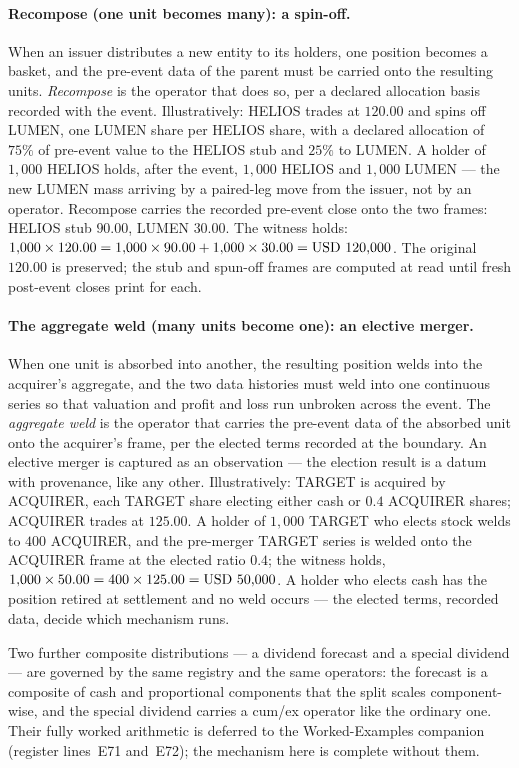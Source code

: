 \paragraph{Recompose (one unit becomes many): a spin-off.}
When an issuer distributes a new entity to its holders, one position becomes a basket, and
the pre-event data of the parent must be carried onto the resulting units. \emph{Recompose}
is the operator that does so, per a declared allocation basis recorded with the event.
Illustratively: HELIOS trades at $120.00$ and spins off LUMEN, one LUMEN share per HELIOS
share, with a declared allocation of $75\%$ of pre-event value to the HELIOS stub and
$25\%$ to LUMEN. A holder of $1{,}000$ HELIOS holds, after the event, $1{,}000$ HELIOS and
$1{,}000$ LUMEN --- the new LUMEN mass arriving by a paired-leg move from the issuer, not by
an operator. Recompose carries the recorded pre-event close onto the two frames: HELIOS stub
$90.00$, LUMEN $30.00$. The witness holds: $1{,}000 \times 120.00 = 1{,}000 \times 90.00 +
1{,}000 \times 30.00 = \mbox{USD~120{,}000}$. The original $120.00$ is preserved; the stub and
spun-off frames are computed at read until fresh post-event closes print for each.

\paragraph{The aggregate weld (many units become one): an elective merger.}
When one unit is absorbed into another, the resulting position welds into the acquirer's
aggregate, and the two data histories must weld into one continuous series so that valuation
and profit and loss run unbroken across the event. The \emph{aggregate weld} is the operator
that carries the pre-event data of the absorbed unit onto the acquirer's frame, per the
elected terms recorded at the boundary. An elective merger is captured as an observation ---
the election result is a datum with provenance, like any other. Illustratively: TARGET is
acquired by ACQUIRER, each TARGET share electing either  cash or $0.4$ ACQUIRER
shares; ACQUIRER trades at $125.00$. A holder of $1{,}000$ TARGET who elects stock welds to
$400$ ACQUIRER, and the pre-merger TARGET series is welded onto the ACQUIRER frame at the
elected ratio $0.4$; the witness holds, $1{,}000 \times 50.00 = 400 \times 125.00 =
\mbox{USD~50{,}000}$. A holder who elects cash has the position retired at settlement and no weld
occurs --- the elected terms, recorded data, decide which mechanism runs.

Two further composite distributions --- a dividend forecast and a special dividend --- are
governed by the same registry and the same operators: the forecast is a composite of cash
and proportional components that the split scales component-wise, and the special dividend
carries a cum/ex operator like the ordinary one. Their fully worked arithmetic is deferred
to the Worked-Examples companion (register lines~E71 and~E72); the mechanism here is
complete without them.

